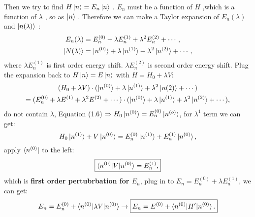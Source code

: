 \documentclass[11pt,a4paper]{report}
\begin{document}
Then we try to find $H\ket{n}=E_n\ket{n}$ . $E_n$ must be a function of $H$ ,which is a function of $\lambda$ , so as $\ket{n}$ . Therefore we can make a Taylor expansion of $E_n(\lambda)$ and $\ket{n(\lambda)}$ :
\begin{equation}
    \begin{aligned}
        E_n(\lambda)&=E_n^{(0)}+\lambda E^{(1)}_n+\lambda^2 E^{(2)}_n+\cdots , 
        \\ 
        \ket{N(\lambda)}&=\ket{n^{(0)}}+\lambda \ket{n^{(1)}}+\lambda^2 \ket{n^{(2)}}+\cdots , 
    \end{aligned}
\end{equation}
where $\lambda E^{(1)}_n$ is first order energy shift. $\lambda E^{(2)}_n$ is second order energy shift. Plug the expansion back to $H\ket{n}=E\ket{n}$ with $H=H_0+\lambda V$:
\begin{multline}
    (H_0+\lambda V)\cdot (\ket{n^{(0)}}+\lambda \ket{n^{(1)}}+\lambda^2\ket{n{(2)}}+\cdots)\\=(E^{(0)}_n+\lambda E^{(1)}+\lambda^2E^{(2)}+\cdots)\cdot (\ket{n^{(0)}}+\lambda \ket{n^{(1)}}+\lambda^2\ket{n^{(2)}}+\cdots) , 
\end{multline}
do not contain $\lambda$, Equation (1.6) $\Rightarrow H_0\ket{n^{(0)}}=E^{(0)}_n\ket{n^{(o)}}$, for $\lambda^1$ term we can get:
\begin{equation}
    H_0\ket{n^{(1)}}+V\ket{n^{(0)}}=E^{(0)}_n\ket{n^{(1)}}+E^{(1)}_n\ket{n^{(0)}} , 
\end{equation}
apply $\bra{n^{(0)}}$ to the left:
\begin{equation}
    \boxed{ \braket{n^{(0)}|V|n^{(0)}}=E^{(1)}_n , }  
\end{equation}
which is {\bf first order pertubrbation for $E_n$}, plug in to $E_n=E^{(0)}_n+\lambda E^{(1)}_n $, we can get:
\begin{equation}
    \begin{aligned}
        E_n= E^{(0)}_n+ \braket{n^{(0)}|\lambda V|n^{(0)}} \to \boxed {E_n=E^{(0)}+\braket{n^{(0)}|H'|n^{(0)}} . }
    \end{aligned}    
\end{equation}
\end{document}
